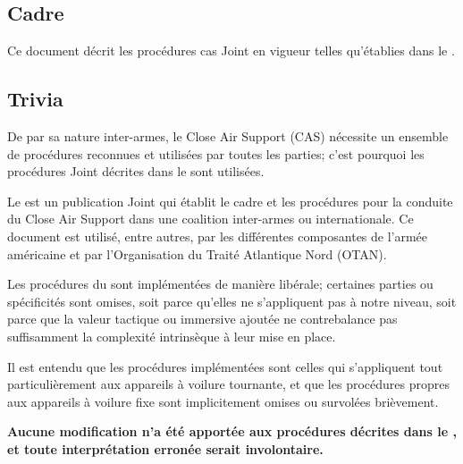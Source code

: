 
%

\begin{imini}
\subsection*{Cadre}

\vfil

Ce document décrit les procédures \acrfull{cas} Joint en vigueur telles qu'établies dans le \jp{}.

\vfill

\subsection*{Trivia}

\vfil

De par sa nature inter-armes, le Close Air Support (CAS) nécessite un ensemble de procédures reconnues et utilisées par toutes les parties; c'est pourquoi les procédures Joint décrites dans le \jp{} sont utilisées.

\vfil

Le \jp{} est un publication Joint qui établit le cadre et les procédures pour la conduite du Close Air Support dans une coalition inter-armes ou internationale. Ce document est utilisé, entre autres, par les différentes composantes de l'armée américaine et par l'Organisation du Traité Atlantique Nord (OTAN).

\vfil

Les procédures du \jp{} sont implémentées de manière libérale; certaines parties ou spécificités sont omises, soit parce qu'elles ne s'appliquent pas à notre niveau, soit parce que la valeur tactique ou immersive ajoutée ne contrebalance pas suffisamment la complexité intrinsèque à leur mise en place.

\vfil

Il est entendu que les procédures implémentées sont celles qui s'appliquent tout particulièrement aux appareils à voilure tournante, et que les procédures propres aux appareils à voilure fixe sont implicitement omises ou survolées brièvement.

\vfil

\textbf{Aucune modification n'a été apportée aux procédures décrites dans le \jp{}, et toute interprétation erronée serait involontaire.}
\end{imini}